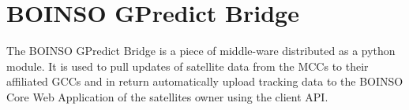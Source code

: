 \documentclass[BachelorPaper]{subfiles}
\begin{document}
\section{BOINSO GPredict Bridge}
\label{sec:intro_boinso_bridge}
The BOINSO GPredict Bridge is a piece of middle-ware distributed as a python module. It is used to pull updates of satellite data from the \acp{MCC} to their affiliated \acp{GCC} and in return automatically upload tracking data to the BOINSO Core Web Application of the satellites owner using the client \ac{API}.
\end{document}

